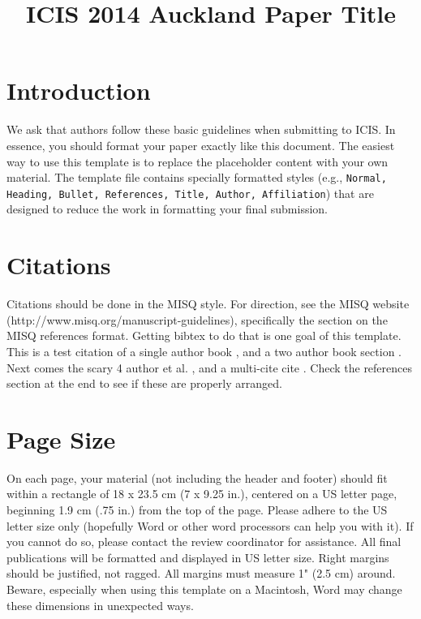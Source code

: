 \documentclass{icis}
\title{ICIS 2014 Auckland Paper Title}
\begin{document}
\maketitle

\section{Introduction}

We ask that authors follow these basic guidelines when submitting to ICIS. In
essence, you should format your paper exactly like this document. The easiest
way to use this template is to replace the placeholder content with your own
material. The template file contains specially formatted styles (e.g.,
\texttt{Normal, Heading, Bullet, References, Title, Author, Affiliation}) that
are designed to reduce the work in formatting your final submission.

\section{Citations}

Citations should be done in the MISQ style. For direction, see the MISQ website
(http://www.misq.org/manuscript-guidelines), specifically the section on the
MISQ references format. Getting bibtex to do that is one goal of this
template. This is a test citation of a single author book
\autocite{bonini_simulation_1963}, and a two author book section
\autocite{chenhall_formal_1989}. Next comes the scary 4 author et
al. \autocite{zhang2006}, and a multi-cite cite \autocite{bonini_simulation_1963,
  ackoff_management_1961}. Check the references section at the end to see if
these are properly arranged.

\section{Page Size}
On each page, your material (not including the header and footer) should fit
within a rectangle of 18 x 23.5 cm (7 x 9.25 in.), centered on a US letter page,
beginning 1.9 cm (.75 in.) from the top of the page.  Please adhere to the US
letter size only (hopefully Word or other word processors can help you with
it). If you cannot do so, please contact the review coordinator for
assistance. All final publications will be formatted and displayed in US letter
size. Right margins should be justified, not ragged. All margins must measure 1"
(2.5 cm) around. Beware, especially when using this template on a Macintosh,
Word may change these dimensions in unexpected ways.
\end{document}
